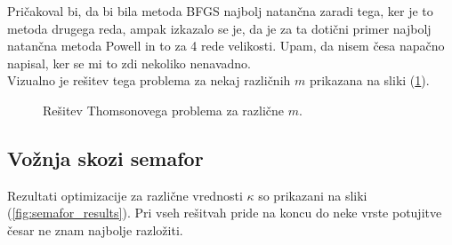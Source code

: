 \documentclass[a4paper]{article}
\begin{document}
Pričakoval bi, da bi bila metoda BFGS najbolj natančna zaradi tega, ker je to metoda drugega reda, ampak
izkazalo se je, da je za ta dotični primer najbolj natančna metoda Powell in to za 4 rede velikosti. Upam,
da nisem česa napačno napisal, ker se mi to zdi nekoliko nenavadno. \\

Vizualno je rešitev tega problema za nekaj različnih $m$ prikazana na sliki (\ref{fig:thomson}). \\

\begin{figure}[H]
    \centering
    \caption{Rešitev Thomsonovega problema za različne $m$.}
    \label{fig:thomson}
\end{figure}

\subsection{Vožnja skozi semafor}
Rezultati optimizacije za različne vrednosti $\kappa$ so prikazani na sliki (\ref{fig:semafor_results}). Pri vseh
rešitvah pride na koncu do neke vrste potujitve česar ne znam najbolje razložiti.
\end{document}
